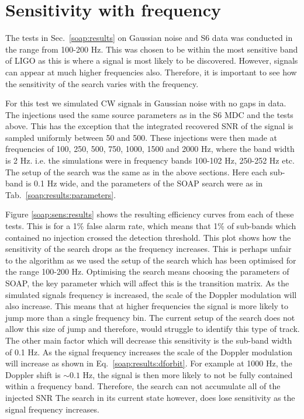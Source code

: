 \clearpage

\section{\label{soap:sensfreq}Sensitivity with frequency}

The tests in Sec.~\ref{soap:results} on Gaussian noise and S6 data was conducted in the range from 100-200 Hz.
This was chosen to be within the most sensitive band of \gls{LIGO} as this is where a signal is most likely to be discovered.
However, signals can appear at much higher frequencies also.
Therefore, it is important to see how the sensitivity of the search varies with the frequency.
 
For this test we simulated \gls{CW} signals in Gaussian noise with no gaps in data. 
The injections used the same source parameters as in the S6 \gls{MDC} \citep{walsh2016ComparisonMethods} and the tests above. 
This has the exception that the integrated recovered \gls{SNR} of the signal is sampled uniformly between 50 and 500. 
These injections were then made at frequencies of 100, 250, 500, 750, 1000, 1500 and 2000 Hz, where the band width is 2 Hz. i.e. the simulations were in frequency bands 100-102 Hz, 250-252 Hz etc.
The setup of the search was the same as in the above sections. 
Here each sub-band is 0.1 Hz wide, and the parameters of the SOAP search were as in Tab.~\ref{soap:results:parameters}.

Figure \ref{soap:sens:results} shows the resulting efficiency curves from each of these tests.
This is for a 1\% false alarm rate, which means that 1\% of sub-bands which contained no injection crossed the detection threshold. 
This plot shows how the sensitivity of the search drops as the frequency increases.
This is perhaps unfair to the algorithm as we used the setup of the search which has been optimised for the range 100-200 Hz.
Optimising the search means choosing the parameters of SOAP, the key parameter which will affect this is the transition matrix. 
As the simulated signals frequency is increased, the scale of the Doppler modulation will also increase.
This means that at higher frequencies the signal is more likely to jump more than a single frequency bin. 
The current setup of the search does not allow this size of jump and therefore, would struggle to identify this type of track.
The other main factor which will decrease this sensitivity is the sub-band width of 0.1 Hz. 
As the signal frequency increases the scale of the
Doppler modulation will increase as shown in Eq.~\ref{soap:results:dforbit}.
For example at 1000 Hz, the Doppler shift is $\sim 0.1$ Hz, the signal is then more likely to not be fully contained within a frequency band. 
Therefore, the search can not accumulate all of the injected \gls{SNR}
The search in its current state however, does lose sensitivity as the signal frequency increases.

